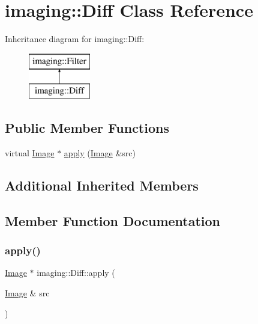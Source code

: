 \hypertarget{classimaging_1_1_diff}{}\section{imaging\+:\+:Diff Class Reference}
\label{classimaging_1_1_diff}
Inheritance diagram for imaging\+:\+:Diff\+:\begin{figure}[H]
\begin{center}
\leavevmode
\includegraphics[height=2.000000cm]{classimaging_1_1_diff}
\end{center}
\end{figure}
\subsection*{Public Member Functions}
\begin{DoxyCompactItemize}
\item 
virtual \hyperlink{classimaging_1_1_image}{Image} $\ast$ \hyperlink{classimaging_1_1_diff_af0562801611f5d33d4319bdab15d29a4}{apply} (\hyperlink{classimaging_1_1_image}{Image} \&src)
\end{DoxyCompactItemize}
\subsection*{Additional Inherited Members}


\subsection{Member Function Documentation}
\mbox{\label{classimaging_1_1_diff_af0562801611f5d33d4319bdab15d29a4}} 
\subsubsection{\texorpdfstring{apply()}{apply()}}
{\footnotesize\ttfamily \hyperlink{classimaging_1_1_image}{Image} $\ast$ imaging\+::\+Diff\+::apply (\begin{DoxyParamCaption}\item[{\hyperlink{classimaging_1_1_image}{Image} \&}]{src }\end{DoxyParamCaption})\hspace{0.3cm}{\ttfamily [virtual]}}

